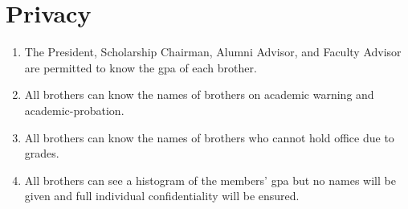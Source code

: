 \section{Privacy}
	\begin{enumerate}
		\item The President, Scholarship Chairman, Alumni Advisor, and Faculty Advisor are permitted to know the \gls{gpa} of each brother.

		\item All brothers can know the names of brothers on academic warning and \gls{academic-probation}.

		\item All brothers can know the names of brothers who cannot hold office due to grades.

		\item All brothers can see a histogram of the members' \gls{gpa} but no names will be given and full individual confidentiality will be ensured.

	\end{enumerate}
